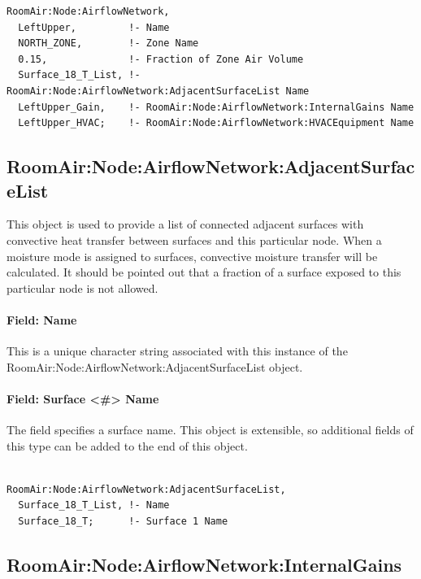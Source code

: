 \begin{lstlisting}
RoomAir:Node:AirflowNetwork,
  LeftUpper,         !- Name
  NORTH_ZONE,        !- Zone Name
  0.15,              !- Fraction of Zone Air Volume
  Surface_18_T_List, !- RoomAir:Node:AirflowNetwork:AdjacentSurfaceList Name
  LeftUpper_Gain,    !- RoomAir:Node:AirflowNetwork:InternalGains Name
  LeftUpper_HVAC;    !- RoomAir:Node:AirflowNetwork:HVACEquipment Name
\end{lstlisting}

\subsection{RoomAir:Node:AirflowNetwork:AdjacentSurfaceList}\label{roomairnodeairflownetworkadjacentsurfacelist}

This object is used to provide a list of connected adjacent surfaces with convective heat transfer between surfaces and this particular node. When a moisture mode is assigned to surfaces, convective moisture transfer will be calculated. It should be pointed out that a fraction of a surface exposed to this particular node is not allowed.

\paragraph{Field: Name}\label{field-name-9-015}

This is a unique character string associated with this instance of the Room\-Air\-:Node:\-Airflow\-Network:\-Adjacent\-Surface\-List object.

\paragraph{Field: Surface \textless{}\#\textgreater{} Name}\label{field-surface-x-name-000}

The field specifies a surface name. This object is extensible, so additional fields of this type can be added to the end of this object.

\begin{lstlisting}

RoomAir:Node:AirflowNetwork:AdjacentSurfaceList,
  Surface_18_T_List, !- Name
  Surface_18_T;      !- Surface 1 Name
\end{lstlisting}

\subsection{RoomAir:Node:AirflowNetwork:InternalGains}\label{roomairnodeairflownetworkinternalgains}

